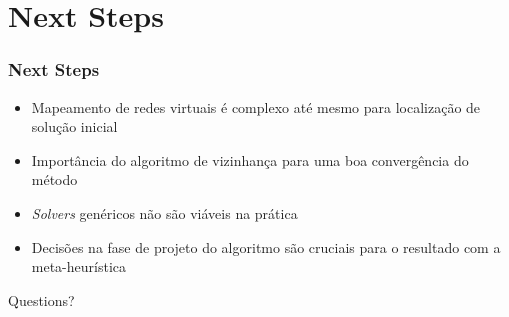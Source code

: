 \documentclass{beamer}
\begin{document}
\section{Next Steps}

\begin{frame}
\frametitle{Next Steps}
\begin{itemize}
\item Mapeamento de redes virtuais é complexo até mesmo para localização de solução inicial
\item Importância do algoritmo de vizinhança para uma boa convergência do método
\item \emph{Solvers} genéricos não são viáveis na prática
\item Decisões na fase de projeto do algoritmo são cruciais para o resultado com a meta-heurística
\end{itemize}
\end{frame}


\begin{frame}
\Huge{\centerline{Questions?}}
\end{frame}

\end{document}
